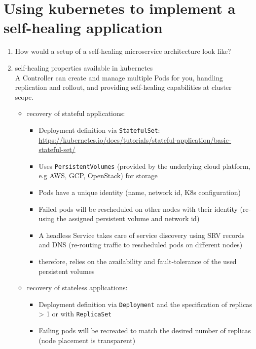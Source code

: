 \section{Using \gls{kubernetes} to implement a self-healing application}
  \begin{enumerate}
    \item How would a setup of a self-healing microservice architecture look like?
    \item self-healing properties available in \gls{kubernetes}\hfill\\
          A Controller can create and manage multiple Pods for you, handling replication and rollout, and providing self-healing capabilities at cluster scope.

          \begin{itemize}
            \item recovery of stateful applications:
              \begin{itemize}
                \item Deployment definition via \texttt{StatefulSet}: \url{https://kubernetes.io/docs/tutorials/stateful-application/basic-stateful-set/}
                \item  Uses \texttt{PersistentVolumes} (provided by the underlying cloud platform, e.g AWS, GCP, OpenStack) for storage
                \item Pods have a unique identity (name, network id, K8s configuration)
                \item Failed pods will be rescheduled on other nodes with their identity (re-using the assigned persistent volume and network id)
                \item A headless Service takes care of service discovery using SRV records and DNS (re-routing traffic to rescheduled pods on different nodes)
                \item therefore, relies on the availability and fault-tolerance of the used persistent volumes
              \end{itemize}

            \item recovery of stateless applications:
              \begin{itemize}
                \item Deployment definition via \texttt{Deployment} and the specification of replicas > 1 or with \texttt{ReplicaSet}
                \item Failing pods will be recreated to match the desired number of replicas (node placement is transparent)
              \end{itemize}


\end{itemize}
\end{enumerate}

